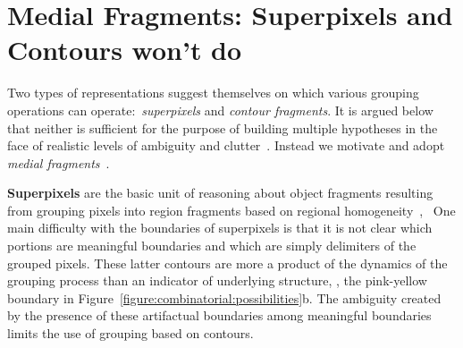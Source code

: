 \section{Medial Fragments: Superpixels  and Contours won't do}
\label{sec:atomic:fragments}
Two types of representations suggest themselves on which various grouping
operations can operate:\ \textit{superpixels} and \textit{contour fragments}. It is argued
below that neither is sufficient for the purpose of building multiple hypotheses
in the face of realistic levels of ambiguity and clutter~\cite{Tamrakar:Kimia:POCV04}.  Instead we motivate and adopt \textit{medial fragments}~\cite{Tamrakar:Kimia:POCV04}. 


\textbf{Superpixels} are the basic unit of reasoning about object fragments resulting
from grouping pixels into region fragments based on regional 
homogeneity~\cite{Ren:Malik:ICCV03,Ahuja:Todorovic:CVPR08,malisiewicz:bmvc07}, \etc\  One
main difficulty with the boundaries of  superpixels is that it is not clear
which portions are meaningful boundaries and which are simply delimiters of the grouped pixels. These latter contours are more a product of the dynamics
of the grouping process than an indicator of underlying structure, \eg,
the pink-yellow boundary in Figure~\ref{figure:combinatorial:possibilities}b. The ambiguity created by the presence
of these artifactual boundaries among meaningful boundaries limits the use of  grouping based on contours.

